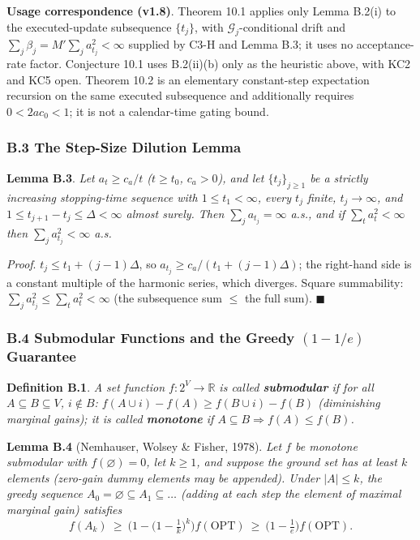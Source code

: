 \documentclass[
  11pt]{article}
\begin{document}
\textbf{Usage correspondence (v1.8)}. Theorem 10.1 applies only Lemma
B.2(i) to the executed-update subsequence \(\{t_j\}\), with
\(\mathcal G_j\)-conditional drift and
\(\sum_j\beta_j=M'\sum_ja_{t_j}^2<\infty\) supplied by C3-H and Lemma
B.3; it uses no acceptance-rate factor. Conjecture 10.1 uses B.2(ii)(b)
only as the heuristic above, with KC2 and KC5 open. Theorem 10.2 is an
elementary constant-step expectation recursion on the same executed
subsequence and additionally requires \(0<2ac_0<1\); it is not a
calendar-time gating bound.

\subsubsection{B.3 The Step-Size Dilution
Lemma}\label{b.3-the-step-size-dilution-lemma}

\textbf{Lemma B.3}. \emph{Let \(a_t \ge c_a/t\) (\(t \ge t_0\),
\(c_a > 0\)), and let \(\{t_j\}_{j\ge1}\) be a strictly increasing
stopping-time sequence with \(1\le t_1<\infty\), every \(t_j\) finite,
\(t_j\to\infty\), and \(1\le t_{j+1}-t_j\le\Delta<\infty\) almost
surely. Then \(\sum_j a_{t_j} = \infty\) a.s., and if
\(\sum_t a_t^2 < \infty\) then \(\sum_j a_{t_j}^2 < \infty\) a.s.}

\emph{Proof}. \(t_j \le t_1 + (j-1)\Delta\), so
\(a_{t_j} \ge c_a/(t_1 + (j-1)\Delta)\); the right-hand side is a
constant multiple of the harmonic series, which diverges. Square
summability: \(\sum_j a_{t_j}^2 \le \sum_t a_t^2 < \infty\) (the
subsequence sum \(\le\) the full sum). \(\blacksquare\)

\subsubsection{\texorpdfstring{B.4 Submodular Functions and the Greedy
\((1-1/e)\)
Guarantee}{B.4 Submodular Functions and the Greedy (1-1/e) Guarantee}}\label{b.4-submodular-functions-and-the-greedy-1-1e-guarantee}

\textbf{Definition B.1}. \emph{A set function \(f: 2^V \to \mathbb{R}\)
is called \textbf{submodular} if for all \(A \subseteq B \subseteq V\),
\(i \notin B\): \(f(A \cup i) - f(A) \ge f(B \cup i) - f(B)\)
(diminishing marginal gains); it is called \textbf{monotone} if
\(A \subseteq B \Rightarrow f(A) \le f(B)\).}

\textbf{Lemma B.4} (Nemhauser, Wolsey \& Fisher, 1978). \emph{Let \(f\)
be monotone submodular with \(f(\varnothing) = 0\), let \(k\ge1\), and
suppose the ground set has at least \(k\) elements (zero-gain dummy
elements may be appended). Under \(|A|\le k\), the greedy sequence
\(A_0 = \varnothing \subseteq A_1 \subseteq \dots\) (adding at each step
the element of maximal marginal gain) satisfies}
\[f(A_k) \ \ge\ \Big(1 - \big(1 - \tfrac1k\big)^k\Big) f(\mathrm{OPT}) \ \ge\ \big(1 - \tfrac1e\big) f(\mathrm{OPT}).\]
\end{document}
